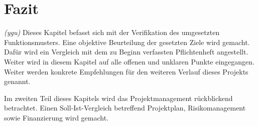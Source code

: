 \newpage
\section{Fazit}
\textit{(ygu)} Dieses Kapitel befasst sich mit der Verifikation des umgesetzten Funktionsmusters. Eine objektive Beurteilung der gesetzten Ziele wird gemacht. Dafür wird ein Vergleich mit dem zu Beginn verfassten Pflichtenheft angestellt. Weiter wird in diesem Kapitel auf alle offenen und unklaren Punkte eingegangen. Weiter werden konkrete Empfehlungen für den weiteren Verlauf dieses Projekts genannt.
\newline

Im zweiten Teil dieses Kapitels wird das Projektmanagement rückblickend betrachtet. Einen Soll-Ist-Vergleich betreffend Projektplan, Risikomanagement sowie Finanzierung wird gemacht.